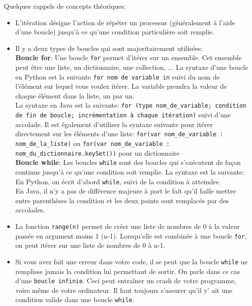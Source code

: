     Quelques rappels de concepts théoriques: \\
    
    \begin{itemize}
    	\item L'itération désigne l'action de répéter un processus (généralement à l'aide d'une boucle) jusqu'à ce qu'une condition particulière soit remplie.
    	\item Il y a deux types de boucles qui sont majoritairement utilisées: \\
    	
    	\textbf{Boucle for}: Une boucle \lstinline{for} permet d'itérer sur un ensemble. Cet ensemble peut être une liste, un dictionnaire, une collection, ... La syntaxe d'une boucle en Python est la suivante \lstinline{for nom de variable in} suivi du nom de l'élément sur lequel vous voulez itérer. La variable prendra la valeur de chaque élément dans la liste, un par un. \\
    	
    	
             	
     	La syntaxe en Java est la suivante: \lstinline{for (type nom_de_variable; condition de fin de boucle; incrémentation à chaque itération)} suivi d'une accolade. Il est également d'utiliser la syntaxe suivante pour itérer directement sur les éléments d'une liste: \lstinline{for(var nom_de_variable : nom_de_la_liste)} ou \lstinline{for(var nom_de_variable : nom_du_dictionnaire.keySet())} pour un dictionnaire\\
     	
        	 
        \textbf{Boucle while}: Les boucles \lstinline{while} sont des boucles qui s’exécutent de façon continue jusqu’à ce qu’une condition soit remplie. La syntaxe est la suivante: En Python, on écrit d’abord \lstinline{while}, suivi de la condition à atteindre.\\
     	
     	En Java, il n'y a pas de différence majeure à part le fait qu'il faille mettre entre parenthèses la condition et les deux points sont remplacés par des accolades. \\
     	
     	
     	\item La fonction \lstinline{range(n)} permet de créer une liste de nombres de 0 à la valeur passée en argument moins 1 (n-1). Lorsqu’elle est combinée à une boucle \lstinline{for}, on peut itérer sur une liste de nombres de 0 à n-1. \\
     	
     	\item Si vous avez fait une erreur dans votre code, il se peut que la boucle \lstinline{while} ne remplisse jamais la condition lui permettant de sortir. On parle dans ce cas d'une \lstinline{boucle infinie}. Ceci peut entraîner un crash de votre programme, voire même de votre ordinateur. Il faut toujours s'assurer qu'il y' ait une condition valide dans une boucle \lstinline{while}. \\\\
     	
     	\end{itemize}
     	
